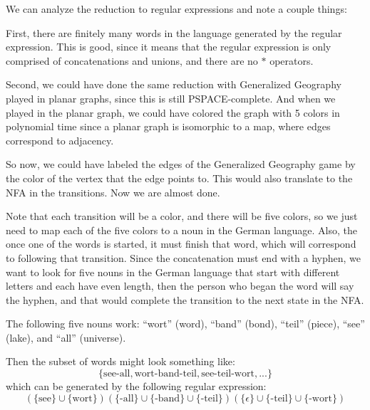 \documentclass[11pt]{article}
\begin{document}
We can analyze the reduction to regular expressions and note a couple things:

First, there are finitely many words in the language generated by the regular expression. This is good, since it means that the regular expression is only comprised of concatenations and unions, and there are no $*$ operators. 

Second, we could have done the same reduction with Generalized Geography played in planar graphs, since this is still PSPACE-complete. And when we played in the planar graph, we could have colored the graph with 5 colors in polynomial time since a planar graph is isomorphic to a map, where edges correspond to adjacency. 

So now, we could have labeled the edges of the Generalized Geography game by the color of the vertex that the edge points to. This would also translate to the NFA in the transitions. Now we are almost done. 

Note that each transition will be a color, and there will be five colors, so we just need to map each of the five colors to a noun in the German language. Also, the once one of the words is started, it must finish that word, which will correspond to following that transition. Since the concatenation must end with a hyphen, we want to look for five nouns in the German language that start with different letters and each have even length, then the person who began the word will say the hyphen, and that would complete the transition to the next state in the NFA. 

The following five nouns work: ``wort'' (word), ``band'' (bond), ``teil'' (piece), ``see'' (lake), and ``all'' (universe). 

Then the subset of words might look something like:
\[ \{ \text{see-all}, \text{wort-band-teil}, \text{see-teil-wort}, ... \} \]
which can be generated by the following regular expression:
\[ (\{\text{see} \}\cup \{ \text{wort}\})(\{\text{-all} \} \cup \{\text{-band}\} \cup \{ \text{-teil} \})( \{ \epsilon\} \cup \{ \text{-teil} \} \cup \{\text{-wort} \}) \]
\end{document}
